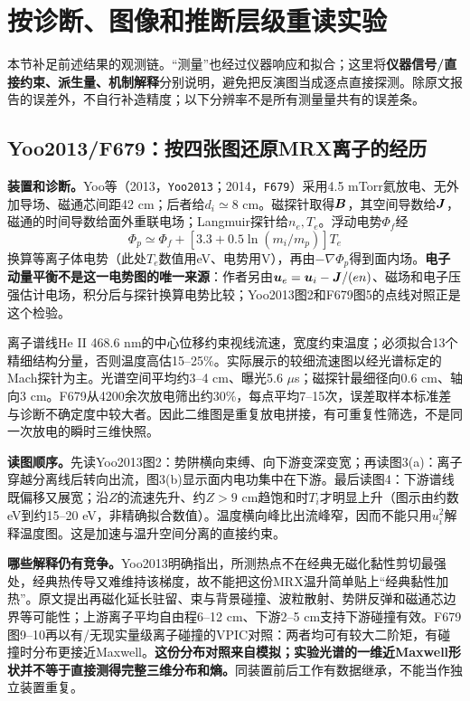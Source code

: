 \section{按诊断、图像和推断层级重读实验}
\label{sec:measurement_chain}
本节补足前述结果的观测链。“测量”也经过仪器响应和拟合；这里将\textbf{仪器信号/直接约束、派生量、机制解释}分别说明，避免把反演图当成逐点直接探测。除原文报告的误差外，不自行补造精度；以下分辨率不是所有测量量共有的误差条。

\subsection{Yoo2013/F679：按四张图还原MRX离子的经历}
\textbf{装置和诊断。}Yoo等（2013，\texttt{Yoo2013}；2014，\texttt{F679}）采用4.5 mTorr氦放电、无外加导场、磁通芯间距42 cm；后者给$d_i\simeq8$ cm。磁探针取得$\bm{B}$，其空间导数给$\bm{J}$，磁通的时间导数给面外重联电场；Langmuir探针给$n_e,T_e$。浮动电势$\Phi_f$经
\begin{equation}
\Phi_p\simeq\Phi_f+[3.3+0.5\ln(m_i/m_p)]T_e
\end{equation}
换算等离子体电势（此处$T_e$数值用eV、电势用V），再由$-\nabla\Phi_p$得到面内场。\textbf{电子动量平衡不是这一电势图的唯一来源}：作者另由$\bm{u}_e=\bm{u}_i-\bm{J}/(en)$、磁场和电子压强估计电场，积分后与探针换算电势比较；Yoo2013图2和F679图5的点线对照正是这个检验。\citep{Yoo2013,F679}

离子谱线He II 468.6 nm的中心位移约束视线流速，宽度约束温度；必须拟合13个精细结构分量，否则温度高估15--25\%。实际展示的较细流速图以经光谱标定的Mach探针为主。光谱空间平均约3--4 cm、曝光5.6 $\mu$s；磁探针最细径向0.6 cm、轴向3 cm。F679从4200余次放电筛出约30\%，每点平均7--15次，误差取样本标准差与诊断不确定度中较大者。因此二维图是重复放电拼接，有可重复性筛选，不是同一次放电的瞬时三维快照。

\textbf{读图顺序。}先读Yoo2013图2：势阱横向束缚、向下游变深变宽；再读图3(a)：离子穿越分离线后转向出流，图3(b)显示面内电功集中在下游。最后读图4：下游谱线既偏移又展宽；沿$Z$的流速先升、约$Z>9$ cm趋饱和时$T_i$才明显上升（图示由约数eV到约15--20 eV，非精确拟合数值）。温度横向峰比出流峰窄，因而不能只用$u_i^2$解释温度图。这是加速与温升空间分离的直接约束。

\textbf{哪些解释仍有竞争。}Yoo2013明确指出，所测热点不在经典无磁化黏性剪切最强处，经典热传导又难维持该梯度，故不能把这份MRX温升简单贴上“经典黏性加热”。原文提出再磁化延长驻留、束与背景碰撞、波粒散射、势阱反弹和磁通芯边界等可能性；上游离子平均自由程6--12 cm、下游2--5 cm支持下游碰撞有效。F679图9--10再以有/无现实量级离子碰撞的VPIC对照：两者均可有较大二阶矩，有碰撞时分布更接近Maxwell。\textbf{这份分布对照来自模拟；实验光谱的一维近Maxwell形状并不等于直接测得完整三维分布和熵。}同装置前后工作有数据继承，不能当作独立装置重复。


